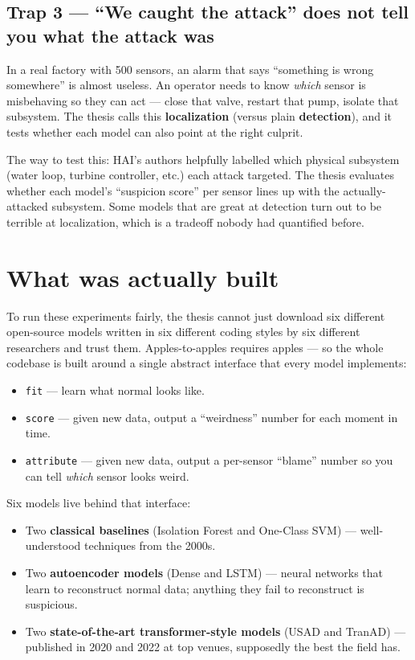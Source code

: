 \documentclass[11pt,a4paper]{article}
\newcommand{\code}[1]{\texttt{#1}}
\begin{document}
\subsection{Trap 3 --- ``We caught the attack'' does not tell you what the attack was}

In a real factory with 500 sensors, an alarm that says ``something is wrong somewhere'' is almost useless. An operator needs to know \emph{which} sensor is misbehaving so they can act --- close that valve, restart that pump, isolate that subsystem. The thesis calls this \textbf{localization} (versus plain \textbf{detection}), and it tests whether each model can also point at the right culprit.

The way to test this: HAI's authors helpfully labelled which physical subsystem (water loop, turbine controller, etc.) each attack targeted. The thesis evaluates whether each model's ``suspicion score'' per sensor lines up with the actually-attacked subsystem. Some models that are great at detection turn out to be terrible at localization, which is a tradeoff nobody had quantified before.

\section{What was actually built}

To run these experiments fairly, the thesis cannot just download six different open-source models written in six different coding styles by six different researchers and trust them. Apples-to-apples requires apples --- so the whole codebase is built around a single abstract interface that every model implements:

\begin{itemize}
  \item \code{fit} --- learn what normal looks like.
  \item \code{score} --- given new data, output a ``weirdness'' number for each moment in time.
  \item \code{attribute} --- given new data, output a per-sensor ``blame'' number so you can tell \emph{which} sensor looks weird.
\end{itemize}

Six models live behind that interface:

\begin{itemize}
  \item Two \textbf{classical baselines} (Isolation Forest and One-Class SVM) --- well-understood techniques from the 2000s.
  \item Two \textbf{autoencoder models} (Dense and LSTM) --- neural networks that learn to reconstruct normal data; anything they fail to reconstruct is suspicious.
  \item Two \textbf{state-of-the-art transformer-style models} (USAD and TranAD) --- published in 2020 and 2022 at top venues, supposedly the best the field has.
\end{itemize}
\end{document}
